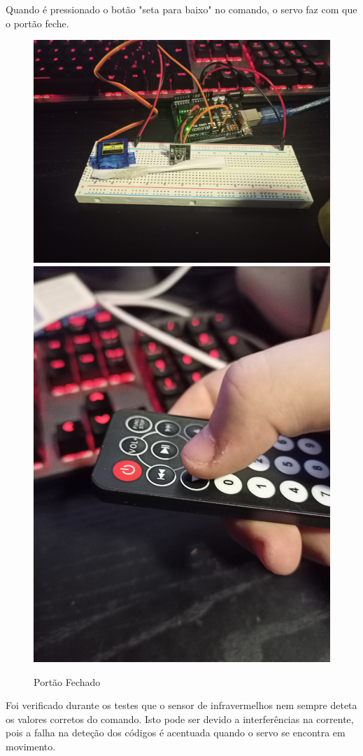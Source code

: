 Quando é pressionado o botão "seta para baixo" no comando, o servo faz com que o portão feche.

\begin{figure}[H]
    \centering
    
    \includegraphics[scale=0.03]{images/testes/sisC_Closed.jpg}
    \includegraphics[scale=0.0225]{images/testes/ControllerDown.jpg}
    \caption{Portão Fechado}
\end{figure}


Foi verificado durante os testes que o sensor de infravermelhos nem sempre deteta os valores corretos do comando. Isto pode ser devido a interferências na corrente, pois a falha na deteção dos códigos é acentuada quando o servo se encontra em movimento.